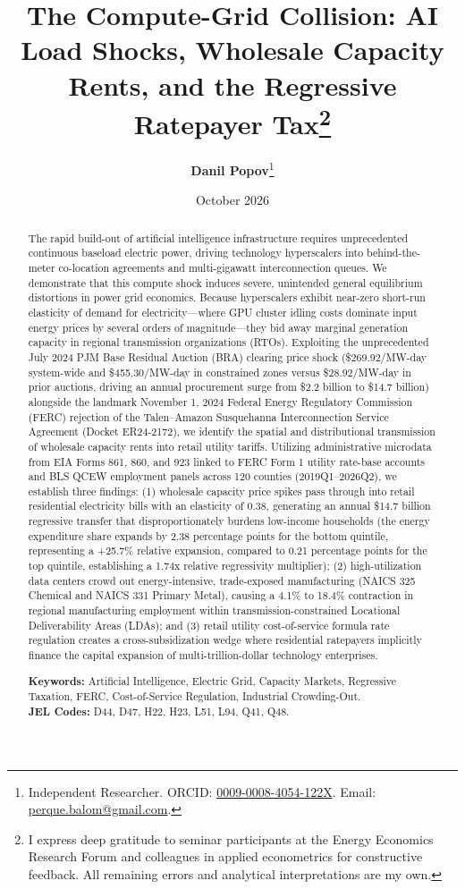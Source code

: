 \documentclass[11pt,a4paper]{article}
\title{\textbf{The Compute-Grid Collision: AI Load Shocks, Wholesale Capacity Rents, and the Regressive Ratepayer Tax}\thanks{I express deep gratitude to seminar participants at the Energy Economics Research Forum and colleagues in applied econometrics for constructive feedback. All remaining errors and analytical interpretations are my own.}}
\author{\textbf{Danil Popov}\thanks{Independent Researcher. ORCID: \href{https://orcid.org/0009-0008-4054-122X}{0009-0008-4054-122X}. Email: \href{mailto:perque.balom@gmail.com}{perque.balom@gmail.com}.}}
\date{October 2026}
\begin{document}
\maketitle

\begin{abstract}
\noindent The rapid build-out of artificial intelligence infrastructure requires unprecedented continuous baseload electric power, driving technology hyperscalers into behind-the-meter co-location agreements and multi-gigawatt interconnection queues. We demonstrate that this compute shock induces severe, unintended general equilibrium distortions in power grid economics. Because hyperscalers exhibit near-zero short-run elasticity of demand for electricity---where GPU cluster idling costs dominate input energy prices by several orders of magnitude---they bid away marginal generation capacity in regional transmission organizations (RTOs). Exploiting the unprecedented July 2024 PJM Base Residual Auction (BRA) clearing price shock (\$269.92/MW-day system-wide and \$455.30/MW-day in constrained zones versus \$28.92/MW-day in prior auctions, driving an annual procurement surge from \$2.2 billion to \$14.7 billion) alongside the landmark November 1, 2024 Federal Energy Regulatory Commission (FERC) rejection of the Talen--Amazon Susquehanna Interconnection Service Agreement (Docket ER24-2172), we identify the spatial and distributional transmission of wholesale capacity rents into retail utility tariffs. Utilizing administrative microdata from EIA Forms 861, 860, and 923 linked to FERC Form 1 utility rate-base accounts and BLS QCEW employment panels across 120 counties (2019Q1--2026Q2), we establish three findings: (1) wholesale capacity price spikes pass through into retail residential electricity bills with an elasticity of 0.38, generating an annual \$14.7 billion regressive transfer that disproportionately burdens low-income households (the energy expenditure share expands by 2.38 percentage points for the bottom quintile, representing a +25.7\% relative expansion, compared to 0.21 percentage points for the top quintile, establishing a 1.74x relative regressivity multiplier); (2) high-utilization data centers crowd out energy-intensive, trade-exposed manufacturing (NAICS 325 Chemical and NAICS 331 Primary Metal), causing a 4.1\% to 18.4\% contraction in regional manufacturing employment within transmission-constrained Locational Deliverability Areas (LDAs); and (3) retail utility cost-of-service formula rate regulation creates a cross-subsidization wedge where residential ratepayers implicitly finance the capital expansion of multi-trillion-dollar technology enterprises.
\vspace{1em}

\noindent \textbf{Keywords:} Artificial Intelligence, Electric Grid, Capacity Markets, Regressive Taxation, FERC, Cost-of-Service Regulation, Industrial Crowding-Out. \\
\noindent \textbf{JEL Codes:} D44, D47, H22, H23, L51, L94, Q41, Q48.
\end{abstract}
\end{document}
